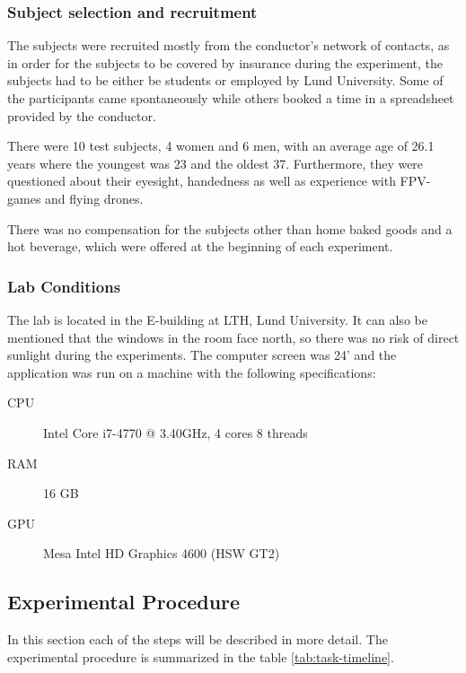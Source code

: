 \documentclass[nofilelist]{cslthse-msc}
\begin{document}
\subsubsection{Subject selection and recruitment}
The subjects were recruited mostly from the conductor's network of contacts, as in order for the subjects to be covered by insurance during the experiment, the subjects had to be either be students or employed by Lund University. Some of the participants came spontaneously while others booked a time in a spreadsheet provided by the conductor.

There were 10 test subjects, 4 women and 6 men, with an average age of 26.1 years where the youngest was 23 and the oldest 37. Furthermore, they were questioned about their eyesight, handedness as well as experience with FPV-games and flying drones.

There was no compensation for the subjects other than home baked goods and a hot beverage, which were offered at the beginning of each experiment. 

\subsubsection{Lab Conditions}
The lab is located in the E-building at LTH, Lund University. It can also be mentioned that the windows in the room face north, so there was no risk of direct sunlight during the experiments.
The computer screen was 24' and the application was run on a machine with the following specifications:
\begin{description}
   \item[CPU] Intel Core i7-4770 @ 3.40GHz, 4 cores 8 threads
   \item[RAM] 16 GB
   \item[GPU] Mesa Intel HD Graphics 4600 (HSW GT2)
\end{description}

\subsection{Experimental Procedure}
In this section each of the steps will be described in more detail. The experimental procedure is summarized in the table \ref{tab:task-timeline}.
\end{document}
